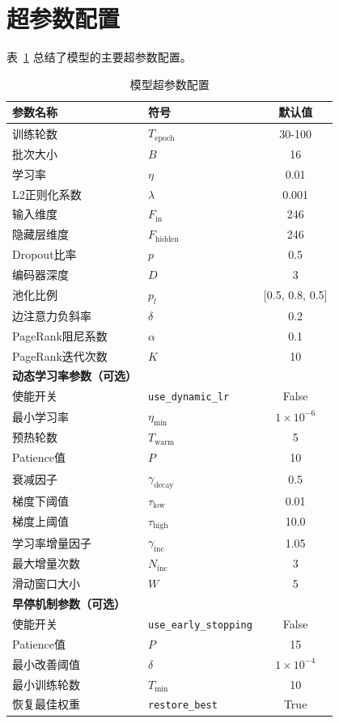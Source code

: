 \section{超参数配置}

表~\ref{tab:hyperparameters} 总结了模型的主要超参数配置。

\begin{table}[htbp]
\centering
\caption{模型超参数配置}
\label{tab:hyperparameters}
\begin{tabular}{llc}
\toprule
参数名称 & 符号 & 默认值 \\
\midrule
训练轮数 & $T_{\text{epoch}}$ & 30-100 \\
批次大小 & $B$ & 16 \\
学习率 & $\eta$ & 0.01 \\
L2正则化系数 & $\lambda$ & 0.001 \\
输入维度 & $F_{\text{in}}$ & 246 \\
隐藏层维度 & $F_{\text{hidden}}$ & 246 \\
Dropout比率 & $p$ & 0.5 \\
编码器深度 & $D$ & 3 \\
池化比例 & $p_l$ & [0.5, 0.8, 0.5] \\
边注意力负斜率 & $\delta$ & 0.2 \\
PageRank阻尼系数 & $\alpha$ & 0.1 \\
PageRank迭代次数 & $K$ & 10 \\
\midrule
\midrule
\textbf{动态学习率参数（可选）} & \textbf{} & \textbf{} \\
使能开关 & \texttt{use\_dynamic\_lr} & False \\
最小学习率 & $\eta_{\text{min}}$ & $1\times10^{-6}$ \\
预热轮数 & $T_{\text{warm}}$ & 5 \\
Patience值 & $P$ & 10 \\
衰减因子 & $\gamma_{\text{decay}}$ & 0.5 \\
梯度下阈值 & $\tau_{\text{low}}$ & 0.01 \\
梯度上阈值 & $\tau_{\text{high}}$ & 10.0 \\
学习率增量因子 & $\gamma_{\text{inc}}$ & 1.05 \\
最大增量次数 & $N_{\text{inc}}$ & 3 \\
滑动窗口大小 & $W$ & 5 \\
\midrule
\midrule
\textbf{早停机制参数（可选）} & \textbf{} & \textbf{} \\
使能开关 & \texttt{use\_early\_stopping} & False \\
Patience值 & $P$ & 15 \\
最小改善阈值 & $\delta$ & $1\times10^{-4}$ \\
最小训练轮数 & $T_{\text{min}}$ & 10 \\
恢复最佳权重 & \texttt{restore\_best} & True \\
\bottomrule
\end{tabular}
\end{table}

